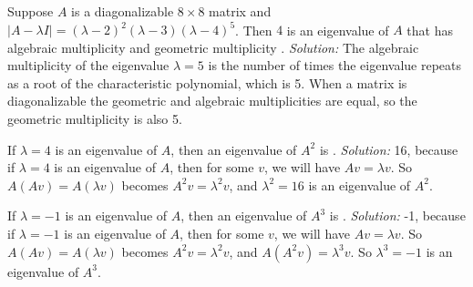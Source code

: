 \begin{parts}
    \ifnum {}
        Suppose $A$ is a diagonalizable $8\times 8$ matrix and $\left|A - \lambda I\right| =  (\lambda -2)^2(\lambda-3)(\lambda-4)^5$. Then $4$ is an eigenvalue of $A$ that has algebraic multiplicity \framebox{\strut\hspace{1cm}} and geometric multiplicity \framebox{\strut\hspace{1cm}}.  
        \ifnum {} {\color{DarkBlue} \textit{Solution:} The algebraic multiplicity of the eigenvalue $\lambda = 5$ is the number of times the eigenvalue repeats as a root of the characteristic polynomial, which is 5. When a matrix is diagonalizable the geometric and algebraic multiplicities are equal, so the geometric multiplicity is also 5.  } \fi  
    \fi        
    
    \ifnum {}
        If $\lambda = 4$ is an eigenvalue of $A$, then an eigenvalue of $A^2$ is \framebox{\strut\hspace{1cm}}. 
        \ifnum {} {\color{DarkBlue} \textit{Solution:} 16, because if $\lambda = 4$ is an eigenvalue of $A$, then for some $v$, we will have $Av=\lambda v$. So $A(Av) = A(\lambda v)$ becomes $A^2v = \lambda^2v$, and $\lambda^2 = 16$ is an eigenvalue of $A^2$.  } \fi    
    \fi 

    \ifnum {}
    If $\lambda = -1$ is an eigenvalue of $A$, then an eigenvalue of $A^3$ is \framebox{\strut\hspace{1cm}}. 
        \ifnum {} {\color{DarkBlue} \textit{Solution:} -1, because if $\lambda = -1$ is an eigenvalue of $A$, then for some $v$, we will have $Av=\lambda v$. So $A(Av) = A(\lambda v)$ becomes $A^2v = \lambda^2v$,  and  $A(A^2v)= \lambda^3 v$. 
        So $\lambda^3 = -1$ is an eigenvalue of $A^3$.  } 
        \fi
    \fi        
\end{parts}